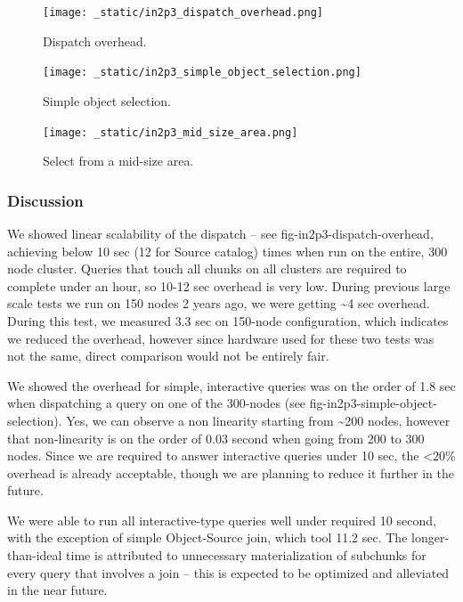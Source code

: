 \documentclass[DM,lsstdraft,toc]{lsstdoc}
\begin{document}
\begin{figure}[H]
\centering
\texttt{[image: \_static/in2p3\_dispatch\_overhead.png]}
\caption{Dispatch overhead.}
\end{figure}

\begin{figure}[H]
\centering
\texttt{[image: \_static/in2p3\_simple\_object\_selection.png]}
\caption{Simple object selection.}
\end{figure}

\begin{figure}[H]
\centering
\texttt{[image: \_static/in2p3\_mid\_size\_area.png]}
\caption{Select from a mid-size area.}
\end{figure}

\subsubsection{Discussion}\label{discussion-2}

We showed linear scalability of the dispatch -- see
fig-in2p3-dispatch-overhead, achieving below 10 sec (12 for Source
catalog) times when run on the entire, 300 node cluster. Queries that
touch all chunks on all clusters are required to complete under an hour,
so 10-12 sec overhead is very low. During previous large scale tests we
run on 150 nodes 2 years ago, we were getting \textasciitilde{}4 sec
overhead. During this test, we measured 3.3 sec on 150-node
configuration, which indicates we reduced the overhead, however since
hardware used for these two tests was not the same, direct comparison
would not be entirely fair.

We showed the overhead for simple, interactive queries was on the order
of 1.8 sec when dispatching a query on one of the 300-nodes (see
fig-in2p3-simple-object-selection). Yes, we can observe a non linearity
starting from \textasciitilde{}200 nodes, however that non-linearity is
on the order of 0.03 second when going from 200 to 300 nodes. Since we
are required to answer interactive queries under 10 sec, the
\textless{}20\% overhead is already acceptable, though we are planning
to reduce it further in the future.

We were able to run all interactive-type queries well under required 10
second, with the exception of simple Object-Source join, which tool 11.2
sec. The longer-than-ideal time is attributed to unnecessary
materialization of subchunks for every query that involves a join --
this is expected to be optimized and alleviated in the near future.
\end{document}
